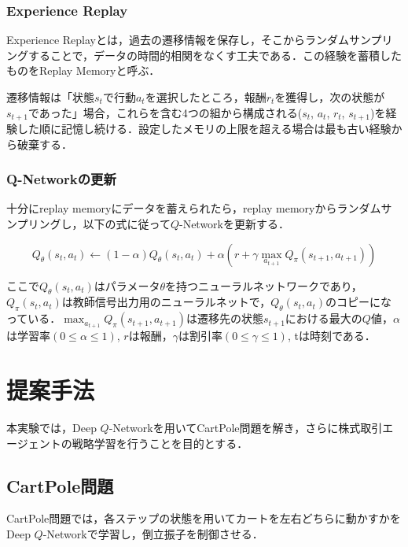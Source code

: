 \documentclass[twocolumn]{jarticle}
\begin{document}
        \subsubsection{Experience Replay}
        Experience Replayとは，過去の遷移情報を保存し，そこからランダムサンプリングすることで，データの時間的相関をなくす工夫である．この経験を蓄積したものをReplay Memoryと呼ぶ．
        
        遷移情報は「状態$s_t$で行動$a_t$を選択したところ，報酬$r_t$を獲得し，次の状態が$s_{t+1}$であった」場合，これらを含む4つの組から構成される($s_t$, $a_t$, $r_t$, $s_{t+1}$)を経験した順に記憶し続ける．設定したメモリの上限を超える場合は最も古い経験から破棄する．

        \subsubsection{Q-Networkの更新}
        十分にreplay memoryにデータを蓄えられたら，replay memoryからランダムサンプリングし，以下の式に従って$Q$-Networkを更新する．

        \begin{equation}
            Q_\theta(s_t,a_t)\leftarrow(1-\alpha)Q_\theta(s_t,a_t)+\alpha(r+\gamma\max_{a_{t+1}}Q_\pi(s_{t+1},a_{t+1}))
        \end{equation}

        ここで$Q_\theta(s_t,a_t)$はパラメータ$\theta$を持つニューラルネットワークであり，$Q_\pi(s_t,a_t)$は教師信号出力用のニューラルネットで，$Q_\theta(s_t,a_t)$のコピーになっている．$\max_{a_{t+1}}Q_\pi(s_{t+1},a_{t+1})$は遷移先の状態$s_{t+1}$における最大の$Q$値，$\alpha$は学習率$(0\leq \alpha\leq 1)$, $r$は報酬，$\gamma$は割引率$(0\leq \gamma\leq 1)$, tは時刻である．


\section{提案手法}
本実験では，Deep $Q$-Networkを用いてCartPole問題を解き，さらに株式取引エージェントの戦略学習を行うことを目的とする．

    \subsection{CartPole問題}
        CartPole問題では，各ステップの状態を用いてカートを左右どちらに動かすかをDeep $Q$-Networkで学習し，倒立振子を制御させる．
\end{document}
